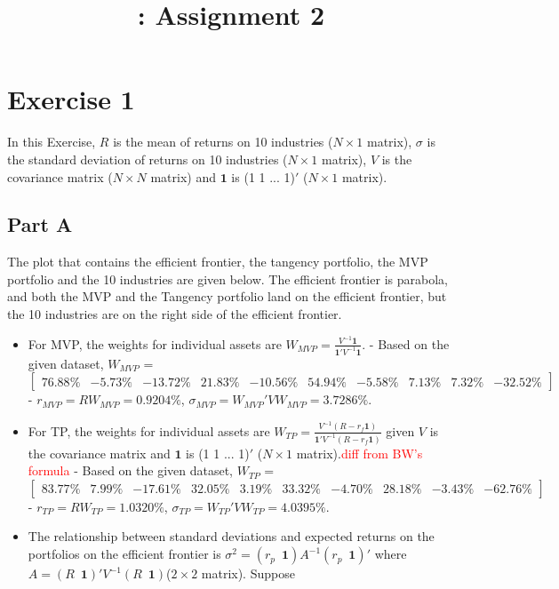 \documentclass{report}
\title{\LectureTitle: Assignment 2}
\begin{document}
\maketitle
\newpage

\section{Exercise 1}
In this Exercise,  $R$ is the mean of returns on 10 industries ($N\times1$ matrix), $\sigma$ is the standard deviation of returns on 10 industries ($N\times1$ matrix), $V$ is the covariance matrix ($N\times N$ matrix) and $\mathbf{1}$ is (1 1 ... 1)$'$ ($N\times1$ matrix).
\subsection{Part A}
The plot that contains the efficient frontier, the tangency portfolio, the MVP portfolio and the 10 industries are given below. The efficient frontier is parabola, and both the MVP and the Tangency portfolio land on the efficient frontier, but the 10 industries are on the right side of the efficient frontier.

\begin{itemize}
\item For MVP, the weights for individual assets are $W_{MVP} = \frac{V^{-1}\mathbf{1}}{\mathbf{1}'V^{-1}\mathbf{1}}$.
\subitem - Based on the given dataset, $W_{MVP}$ = 
\[
\begin{bmatrix}
    76.88\% & -5.73\% & -13.72\% & 21.83\% & -10.56\% & 54.94\% & -5.58\% & 7.13\% & 7.32\% & -32.52\%
\end{bmatrix}
\]
\subitem  - $r_{MVP} = RW_{MVP}= 0.9204\%$,  $\sigma_{MVP} = W_{MVP}'VW_{MVP}= 3.7286\%$.
\item For TP, the weights for individual assets are $W_{TP} = \frac{V^{-1}(R-r_f\mathbf{1})}{\mathbf{1}'V^{-1}(R-r_f\mathbf{1})}$ given $V$ is the covariance matrix and $\mathbf{1}$ is (1 1 ... 1)$'$ ($N\times1$ matrix).\textcolor{red}{diff from BW's formula}
\subitem - Based on the given dataset, $W_{TP}$ = 
\[
\begin{bmatrix}
    83.77\% & 7.99\% & -17.61\% & 32.05\% & 3.19\% & 33.32\% & -4.70\% & 28.18\% & -3.43\% & -62.76\%
\end{bmatrix}
\]
\subitem - $r_{TP} = RW_{TP}= 1.0320\%$,  $\sigma_{TP} = W_{TP}'VW_{TP}= 4.0395\%$.
\item The relationship between standard deviations and expected returns on the portfolios on the efficient frontier is $\sigma^2 = (r_p \,\,\, \mathbf{1}) A^{-1} (r_p \,\,\, \mathbf{1})'$ where $A = (R \,\,\, \mathbf{1})' V^{-1} (R \,\,\, \mathbf{1})$($2\times 2$ matrix). Suppose 
\end{itemize}
\end{document}
